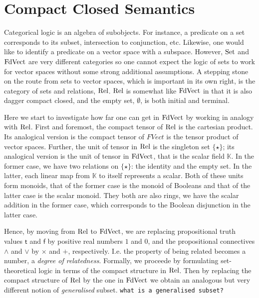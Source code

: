 \newcommand{\FinSet}{\mathrm{FinSet}}
\section{Compact Closed Semantics}
%
Categorical logic is an algebra of subobjects. For instance, a
predicate on a set corresponds to its subset, intersection to
conjunction, etc. Likewise, one would like to identify a predicate on
a vector space with a subspace. However, $\mathrm{Set}$ and $\mathrm{FdVect}$ are very
different categories so one cannot expect the logic of sets to work
for vector spaces without some strong additional assumptions. A
stepping stone on the route from sets to vector spaces, which is
important in its own right, is the category of sets and relations,
$\mathrm{Rel}$. $\mathrm{Rel}$ is somewhat like $\mathrm{FdVect}$ in that it is also dagger
compact closed, and the empty set, $\emptyset$, is both initial and
terminal. 

Here we start to investigate how far one can get in $\mathrm{FdVect}$ by
working in analogy with $\mathrm{Rel}$.  First and foremost, the compact tensor of $\mathrm{Rel}$ is the cartesian product. Its analogical version is the compact tensor of $FVect$ is the tensor product of  vector spaces.  Further, the  unit of tensor in $\mathrm{Rel}$ is the singleton set $\{\star\}$; its analogical version is the unit of tensor in $\mathrm{FdVect}$, that  is the scalar field $\mathbb{K}$. In the former case, we have two relations on $\{\star\}$: the identity and the empty set. In the latter, each linear map from $\mathbb{K}$ to itself represents a scalar. Both of these units form monoids, that of the former case is the monoid of Booleans and that of the latter case is the scalar monoid. They both are also rings, we have the scalar addition in the former case, which corresponds to the Boolean disjunction in the latter case. 


Hence, by moving from $\mathrm{Rel}$ to $\mathrm{FdVect}$, we are replacing propositional
truth values $\mathsf{t}$ and $\mathsf{f}$ by positive real numbers
$1$ and $0$, and the propositional connectives $\wedge$ and $\vee$ by
$\times$ and $+$, respectively.  I.e. the property of being related
becomes a number, a \emph{degree of relatedness}.  Formally, we
proceede by formulating set-theoretical logic in terms of the compact
structure in $\mathrm{Rel}$. Then by replacing the compact structure of $\mathrm{Rel}$
by the one in $\mathrm{FdVect}$ we obtain an analogous but very
different notion of \emph{generalised} subset. {\tt what is a generalised subset?}

